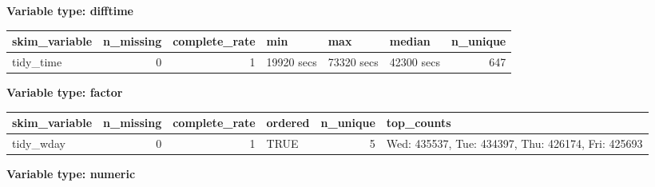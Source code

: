 \documentclass[]{elsarticle} %
\begin{document}
\textbf{Variable type: difftime}

\begin{longtable}[]{@{}lrrlllr@{}}
\toprule
skim\_variable & n\_missing & complete\_rate & min & max & median &
n\_unique\tabularnewline
\midrule
\endhead
tidy\_time & 0 & 1 & 19920 secs & 73320 secs & 42300 secs &
647\tabularnewline
\bottomrule
\end{longtable}

\textbf{Variable type: factor}

\begin{longtable}[]{@{}lrrlrl@{}}
\toprule
skim\_variable & n\_missing & complete\_rate & ordered & n\_unique &
top\_counts\tabularnewline
\midrule
\endhead
tidy\_wday & 0 & 1 & TRUE & 5 & Wed: 435537, Tue: 434397, Thu: 426174,
Fri: 425693\tabularnewline
\bottomrule
\end{longtable}

\textbf{Variable type: numeric}
\end{document}
